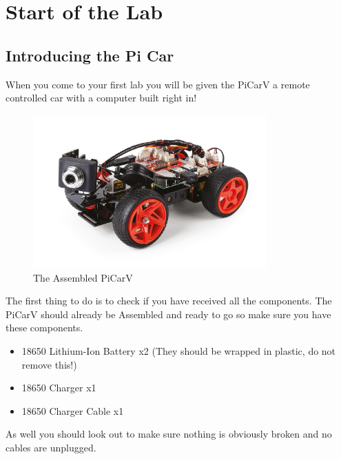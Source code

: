 \documentclass[11pt]{report}
\begin{document}
    \clearpage

    \chapter{Start of the Lab}

    \section{Introducing the Pi Car}
    When you come to your first lab you will be given the PiCarV a remote controlled car with a computer built right in! 

    \begin{figure}[h]
        \centering
        \includegraphics[width=0.8\textwidth]{picarv.jpg}
        \caption{The Assembled PiCarV}
        \label{fig:The Assembled PiCarV}
    \end{figure}

    The first thing to do is to check if you have received all the components. The PiCarV should already be Assembled and ready to go so make sure you have these components.

    \begin{itemize}
        \item 18650 Lithium-Ion Battery x2 (They should be wrapped in plastic, do not remove this!)
        \item 18650 Charger x1
        \item 18650 Charger Cable x1
    \end{itemize}

    As well you should look out to make sure nothing is obviously broken and no cables are unplugged.
\end{document}
